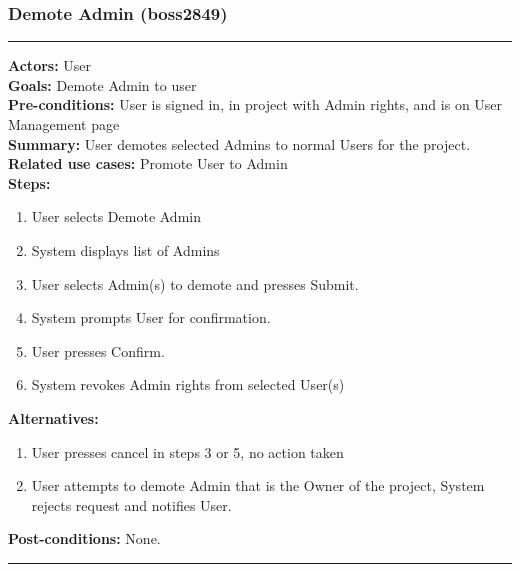 \documentclass[11pt]{report}
\begin{document}
\subsubsection{Demote Admin  (boss2849)}
\vspace{2pt}
\hrule
\vspace{8pt}
 \textbf{Actors:} User \\ 
 \textbf{Goals:} Demote Admin to user \\
 \textbf{Pre-conditions:} User is signed in, in project with Admin rights, and is on User Management page \\
 \textbf{Summary:} User demotes selected Admins to normal Users for the project. \\ 
 \textbf{Related use cases:} Promote User to Admin \\ 
 \textbf{Steps:} \begin{enumerate}
  \item User selects Demote Admin
  \item System displays list of Admins
  \item User selects Admin(s) to demote and presses Submit.
  \item System prompts User for confirmation.
  \item User presses Confirm.
  \item System revokes Admin rights from selected User(s)
 \end{enumerate}
 \textbf{Alternatives:} \begin{enumerate}
  \item User presses cancel in steps 3 or 5, no action taken
  \item User attempts to demote Admin that is the Owner of the project, System rejects request and notifies User.
 \end{enumerate}
 \textbf{Post-conditions:} None. \\
 \vspace{8pt}
\hrule
\newpage
\end{document}
